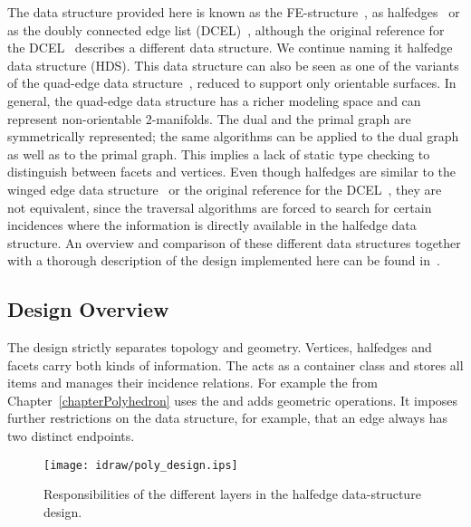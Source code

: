 The data structure provided here is known as the
FE-structure~\cite{w-ebdss-85}, as
halfedges~\cite{m-ism-88,bfh-mgedm-95} or as the doubly connected edge
list (DCEL)~\cite{bkos-cgaa-97}, although the original reference for
the DCEL~\cite{mp-fitcp-78} describes a different data structure. We
continue naming it halfedge data structure (HDS). This data structure
can also be seen as one of the variants of the quad-edge data
structure~\cite{gs-pmgsc-85}, reduced to support only orientable
surfaces. In general, the quad-edge data structure has a richer
modeling space and can represent non-orientable 2-manifolds. The dual
and the primal graph are symmetrically represented; the same
algorithms can be applied to the dual graph as well as to the primal
graph. This implies a lack of static type checking to distinguish
between facets and vertices.  Even though halfedges are similar to the
winged edge data structure~\cite{b-prcv-75} or the original reference
for the DCEL~\cite{mp-fitcp-78}, they are not equivalent, since the
traversal algorithms are forced to search for certain incidences where
the information is directly available in the halfedge data structure.
An overview and comparison of these different data structures together
with a thorough description of the design implemented here can be
found in~\cite{k-ddsps-98}.


\subsection*{Design Overview}

The design strictly separates topology and geometry. Vertices,
halfedges and facets carry both kinds of information. The
 acts as a container class and stores all
items and manages their incidence relations. For example the
 from Chapter~\ref{chapterPolyhedron} uses the
 and adds geometric operations. It
imposes further restrictions on the data structure, for example, that
an edge always has two distinct endpoints.


\begin{ccTexOnly}
  \begin{figure}
    \begin{center}
      \parbox{0.7\textwidth}{%
          \texttt{[image: idraw/poly\_design.ips]}%
      }
    \end{center}
    \caption{Responsibilities of the different layers in the 
             halfedge data-structure design.}
    \label{figurePolyDesign}
  \end{figure}
\end{ccTexOnly}

